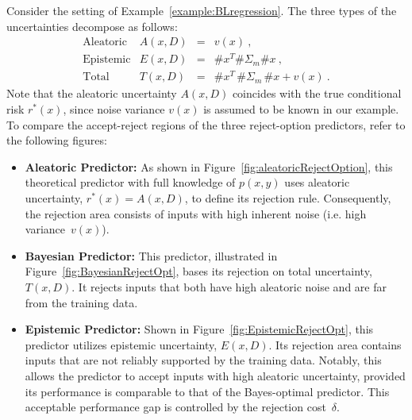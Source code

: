 \begin{example} 
Consider the setting of Example~\ref{example:BLregression}. The three types of the uncertainties decompose as follows:
\[
  \begin{array}{lrcl}
    \text{Aleatoric} & A(x,D) &=& v(x) \:,\\
    \text{Epistemic}  & E(x,D) &=& \#x^T \#\Sigma_m\#x \:,\\
    \text{Total}     & T(x,D) &=& \#x^T\, \#\Sigma_m\, \#x + v(x) \:.
  \end{array}
\]
Note that the aleatoric uncertainty $A(x,D)$ coincides with the true conditional risk $r^*(x)$, since noise variance $v(x)$ is assumed to be known in our example.  To compare the accept-reject regions of the three reject-option predictors, refer to the following figures:
\begin{itemize}
    \item \textbf{Aleatoric Predictor:} As shown in Figure~\ref{fig:aleatoricRejectOption}, this theoretical predictor with full knowledge of $p(x,y)$ uses aleatoric uncertainty, $r^*(x)=A(x,D)$, to define its rejection rule. Consequently, the rejection area consists of inputs with high inherent noise (i.e. high variance~$v(x)$).
    \item \textbf{Bayesian Predictor:} This predictor, illustrated in Figure~\ref{fig:BayesianRejectOpt}, bases its rejection on total uncertainty, $T(x,D)$. It rejects inputs that both have high aleatoric noise and are far from the training data.
    \item \textbf{Epistemic Predictor:} Shown in Figure~\ref{fig:EpistemicRejectOpt}, this predictor utilizes epistemic uncertainty, $E(x,D)$. Its rejection area contains inputs that are not reliably supported by the training data. Notably, this allows the predictor to accept inputs with high aleatoric uncertainty, provided its performance is comparable to that of the Bayes-optimal predictor. This acceptable performance gap is controlled by the rejection cost~$\delta$.
\end{itemize}


\end{example}
